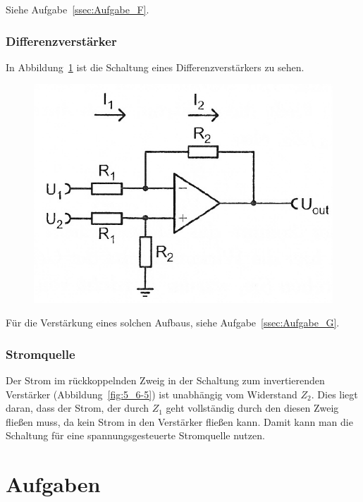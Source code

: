 Siehe Aufgabe~\ref{ssec:Aufgabe_F}.

\FloatBarrier
\subsubsection{Differenzverstärker}

In Abbildung~\ref{fig:5_6-7} ist die Schaltung eines Differenzverstärkers zu
sehen.

\begin{figure}[htbp]
	\centering
	\includegraphics[width=.6\linewidth]{Anleitung/5_6-7.png}
	\caption{%
		\cite[Abbildung~5/6.7]{physik313-Anleitung}
	}
	\label{fig:5_6-7}
\end{figure}

Für die Verstärkung eines solchen Aufbaus, siehe Aufgabe~\ref{ssec:Aufgabe_G}.

\FloatBarrier
\subsubsection{Stromquelle}

Der Strom im rückkoppelnden Zweig in der Schaltung zum invertierenden
Verstärker (Abbildung~\ref{fig:5_6-5}) ist unabhängig vom Widerstand $Z_2$.
Dies liegt daran, dass der Strom, der durch $Z_1$ geht vollständig durch den
diesen Zweig fließen muss, da kein Strom in den Verstärker fließen kann. Damit
kann man die Schaltung für eine spannungsgesteuerte Stromquelle nutzen.



\FloatBarrier
\section{Aufgaben}

